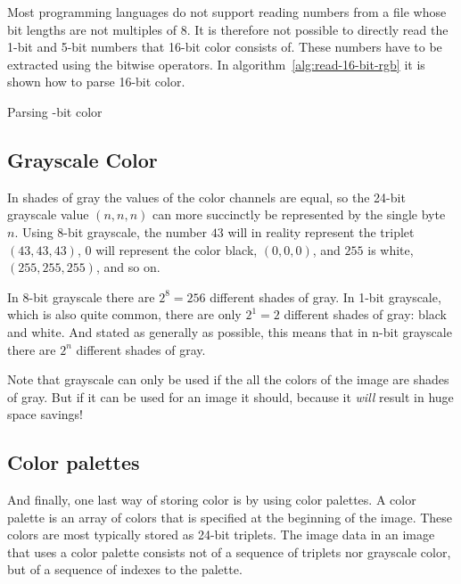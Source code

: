 Most programming languages do not support reading numbers from a file
whose bit lengths are not multiples of 8. It is therefore not possible
to directly read the 1-bit and 5-bit numbers that 16-bit color
consists of. These numbers have to be extracted using the bitwise
operators. In algorithm~\ref{alg:read-16-bit-rgb} it is shown how to
parse 16-bit color.

\begin{algorithm}[H]
  \caption{Parsing -bit color}\algohack{}
  \label{alg:read-16-bit-rgb}
  \begin{algorithmic}[1]
  \end{algorithmic}
\end{algorithm}

\subsection{Grayscale Color}
\label{sec:grayscale-color}

\newcommand{\selfrgbtrip}[3]{\mbox{\textcolor[RGB]{#1,#2,#3}{(#1,#2,#3)}}}
\newcommand{\selfrgbtripgray}[1]{\selfrgbtrip{#1}{#1}{#1}}

In shades of gray the values of the color channels are equal, so the
24-bit grayscale value $(n,n,n)$ can more succinctly be represented by
the single byte $n$. Using 8-bit grayscale, the number $43$ will in
reality represent the triplet $(43,43,43)$, $0$ will represent the
color black, $(0,0,0)$, and $255$ is white, $(255,255,255)$, and so
on.

In 8-bit grayscale there are $2^8 = 256$ different shades of gray. In
1-bit grayscale, which is also quite common, there are only $2^1 = 2$
different shades of gray: black and white. And stated as generally as
possible, this means that in n-bit grayscale there are $2^n$ different
shades of gray.

Note that grayscale can only be used if the all the colors of the
image are shades of gray. But if it can be used for an image it
should, because it \textit{will} result in huge space savings!

\subsection{Color palettes}

And finally, one last way of storing color is by using color
palettes. A color palette is an array of colors that is specified at
the beginning of the image. These colors are most typically stored as
24-bit \rgb triplets. The image data in an image that uses a color
palette consists not of a sequence of triplets nor grayscale
color, but of a sequence of indexes to the palette.

